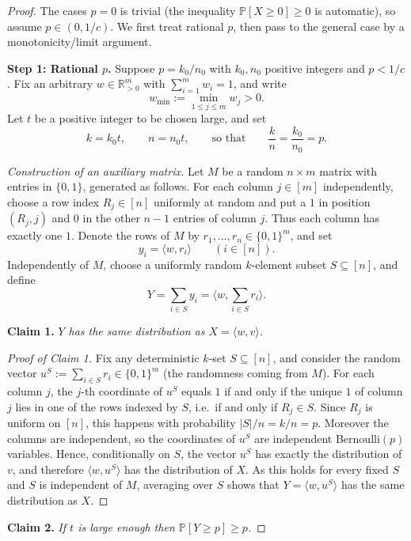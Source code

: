 \begin{proof}
The cases $p=0$ is trivial (the inequality $\mathbb P[X\ge 0]\ge 0$ is automatic), so assume $p\in(0,1/c)$. We first treat rational $p$, then pass to the general case by a monotonicity/limit argument.

\medskip
\noindent\textbf{Step 1: Rational $p$.}
Suppose $p=k_0/n_0$ with $k_0,n_0$ positive integers and $p<1/c$. Fix an arbitrary $w\in\mathbb{R}_{>0}^m$ with $\sum_{i=1}^m w_i=1$, and write
\[
w_{\min}:=\min_{1\le j\le m} w_j>0.
\]
Let $t$ be a positive integer to be chosen large, and set
\[
k=k_0 t,\qquad n=n_0 t,\qquad\text{so that}\qquad \frac{k}{n}=\frac{k_0}{n_0}=p.
\]

\emph{Construction of an auxiliary matrix.}
Let $M$ be a random $n\times m$ matrix with entries in $\{0,1\}$, generated as follows. For each column $j\in[m]$ independently, choose a row index $R_j\in[n]$ uniformly at random and put a $1$ in position $(R_j,j)$ and $0$ in the other $n-1$ entries of column $j$. Thus each column has exactly one $1$. Denote the rows of $M$ by $r_1,\dots,r_n\in\{0,1\}^m$, and set
\[
y_i=\langle w,r_i\rangle\qquad (i\in[n]).
\]
Independently of $M$, choose a uniformly random $k$-element subset $S\subseteq[n]$, and define
\[
Y=\sum_{i\in S}y_i=\Big\langle w,\sum_{i\in S}r_i\Big\rangle.
\]

\medskip
\noindent\textbf{Claim 1.} \emph{$Y$ has the same distribution as $X=\langle w,v\rangle$.}

\begin{proof}[Proof of Claim 1]
Fix any deterministic $k$-set $S\subseteq[n]$, and consider the random vector $u^S:=\sum_{i\in S}r_i\in\{0,1\}^m$ (the randomness coming from $M$). For each column $j$, the $j$-th coordinate of $u^S$ equals $1$ if and only if the unique $1$ of column $j$ lies in one of the rows indexed by $S$, i.e.\ if and only if $R_j\in S$. Since $R_j$ is uniform on $[n]$, this happens with probability $|S|/n=k/n=p$. Moreover the columns are independent, so the coordinates of $u^S$ are independent Bernoulli$(p)$ variables. Hence, conditionally on $S$, the vector $u^S$ has exactly the distribution of $v$, and therefore $\langle w,u^S\rangle$ has the distribution of $X$. As this holds for every fixed $S$ and $S$ is independent of $M$, averaging over $S$ shows that $Y=\langle w,u^S\rangle$ has the same distribution as $X$.
\end{proof}

\medskip
\noindent\textbf{Claim 2.} \emph{If $t$ is large enough then $\mathbb{P}[Y\ge p]\ge p$.}


\end{proof}
